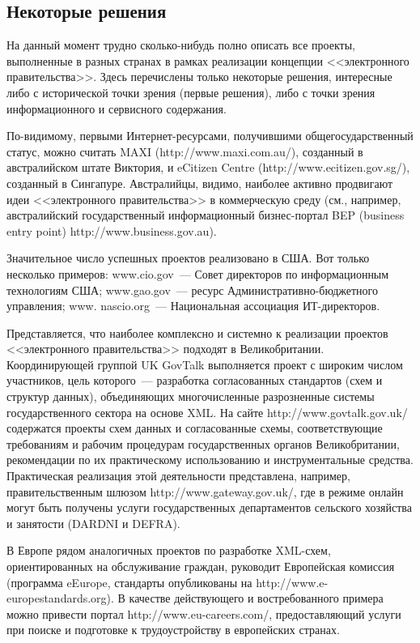 \begin{multicols}{2}
\section{Некоторые решения} %

На данный момент трудно сколько-нибудь полно описать все проекты, выполненные в
разных странах в рамках реализации концепции <<электронного правительства>>. Здесь
перечислены только некоторые решения, интересные либо с исторической точки зрения
(первые решения), либо с точки зрения информационного и сервисного содержания.

По-видимому, первыми Ин\-тер\-нет-ре\-сур\-са\-ми, получившими общегосударственный статус,
можно считать MAXI ({\sf http://www.maxi.com.au/}), созданный в австралийском штате
Виктория, и \mbox{eCitizen} Centre ({\sf http://www.ecitizen.gov.sg/}), созданный в Сингапуре.
Австралийцы, видимо, наиболее актив\-но продвигают идеи <<электронного
правительства>> в коммерческую среду (см., например, австралийский государственный
информационный биз\-нес-пор\-тал BEP (business entry point) {\sf
http://www.\linebreak business.gov.au}).

Значительное число успешных проектов реализовано в США. Вот только несколько
примеров: {\sf www.cio.gov}~--- Совет директоров по информационным технологиям
США; {\sf www.gao.gov}~--- ресурс Ад\-ми\-ни\-ст\-ра\-тив\-но-бюд\-жет\-но\-го управления; {\sf
www. nascio.org}~--- Национальная ассоциация ИТ-ди\-рек\-то\-ров.

Представляется, что наиболее комплексно и сис\-тем\-но к реализации проектов
<<электронного правительства>> подходят в Великобритании. Координирующей группой
UK GovTalk выполняется проект с широким числом участников, цель которого~---
разработка согласованных стандартов (схем и структур данных), объединяющих
многочисленные разрозненные системы государственного сектора на основе XML. На
сайте {\sf http://www.govtalk.gov.uk/} содержатся проекты схем данных и согласованные
схемы, соответствующие требованиям и рабочим процедурам государственных органов
Великобритании, рекомендации по их практическому использованию и инструментальные
средства. Практическая реализация этой де\-я\-тель\-ности представлена, например,
правительственным шлюзом {\sf http://www.gateway.gov.uk/}, где в режиме онлайн могут
быть получены услуги государственных департаментов сельского хозяйства и занятости
(DARDNI и DEFRA).

В Европе рядом аналогичных проектов по разработке XML-схем, ориентированных на
об\-служива\-ние граждан, руководит Европейская комиссия (программа eEurope, стандарты
опубликованы на {\sf http://www.e-europestandards.org}). В качестве дейст\-ву\-юще\-го и
востребованного примера можно при\-вес\-ти портал {\sf http://www.eu-careers.com/},
предо\-став\-ля\-ющий услуги при поиске и подготовке к трудо\-устрой\-ст\-ву в европейских
странах.


\end{multicols}
